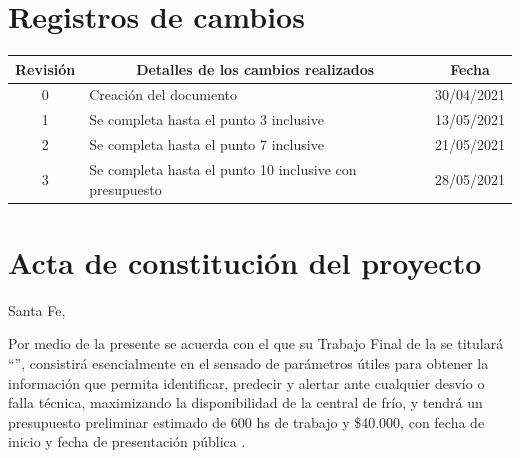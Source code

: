\documentclass[
11pt, %
]{charter}
\begin{document}
\maketitle
\thispagestyle{empty}
\pagebreak


\thispagestyle{empty}
{\setlength{\parskip}{0pt}
\tableofcontents{}
}
\pagebreak


\section{Registros de cambios}
\label{sec:registro}


\begin{table}[ht]
\label{tab:registro}
\centering
\begin{tabularx}{\linewidth}{@{}|c|X|c|@{}}
\hline
\rowcolor[HTML]{C0C0C0} 
Revisión & \multicolumn{1}{c|}{\cellcolor[HTML]{C0C0C0}Detalles de los cambios realizados} & Fecha      \\ \hline
0      & Creación del documento                                 & 30/04/2021 \\ \hline
1      & Se completa hasta el punto 3 inclusive                 & 13/05/2021 \\ \hline
2      & Se completa hasta el punto 7 inclusive                 & 21/05/2021 \\ \hline
3      & Se completa hasta el punto 10 inclusive con presupuesto               & 28/05/2021 \\ \hline
\end{tabularx}
\end{table}

\pagebreak



\section{Acta de constitución del proyecto}
\label{sec:acta}

\begin{flushright}
Santa Fe, \fechaInicioName
\end{flushright}

\vspace{2cm}

Por medio de la presente se acuerda con el \authorname\hspace{1px} que su Trabajo Final de la \degreename\hspace{1px} se titulará ``\ttitle'', consistirá esencialmente en el sensado de parámetros útiles para obtener la información que permita identificar, predecir y alertar ante cualquier desvío o falla técnica, maximizando la disponibilidad de la central de frío, y tendrá un presupuesto preliminar estimado de 600 hs de trabajo y {\$40.000}, con fecha de inicio \fechaInicioName\hspace{1px} y fecha de presentación pública \fechaFinalName.
\end{document}
